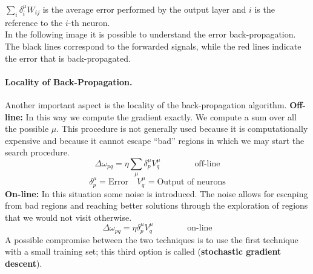 $\sum_{i} \delta_{i}^{\mu} W_{ij}$ is the average error performed by the output layer and $i$ is the reference to the $i$-th neuron.\\
In the following image it is possible to understand the error back-propagation. The black lines correspond to the forwarded signals, while the red lines indicate the error that is back-propagated.

\paragraph*{Locality of Back-Propagation.} Another important aspect is the locality of the back-propagation algorithm.
\textbf{Off-line:} In this way we compute the gradient exactly. We compute a sum over all the possible $\mu$. This procedure is not generally used because it is computationally expensive and because it cannot escape ``bad'' regions in which we may start the search procedure.
$$\Delta \omega_{pq} = \eta \sum_{\mu} \delta_{p}^{\mu} V_{q}^{\mu} \qquad \qquad \text{off-line}$$
$$\delta_{p}^{\mu} = \text{Error} \quad V_{q}^{\mu} = \text{Output of neurons}$$
\textbf{On-line:} In this situation some noise is introduced. The noise allows for escaping from bad regions and reaching better solutions through the exploration of regions that we would not visit otherwise.
$$\Delta \omega_{pq} = \eta\delta_ {p}^{\mu} V_{q}^{\mu} \qquad \qquad \text{on-line}$$
A possible compromise between the two techniques is to use the first technique with a small training set; this third option is called (\textbf{stochastic gradient descent}).


